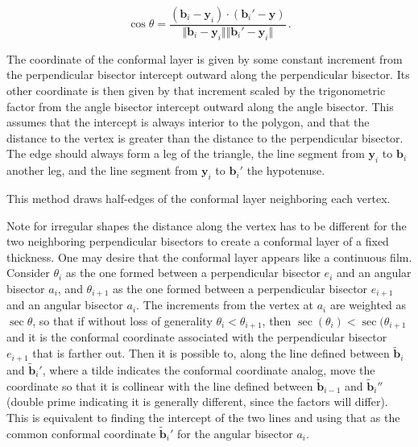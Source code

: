 \documentclass{article}
\begin{document}
$$\cos\theta = \frac{ (\mathbf{b}_i - \mathbf{y}_i) \cdot (\mathbf{b}_i' - \mathbf{y}) }{ \Vert \mathbf{b}_i - \mathbf{y}_i \Vert \Vert \mathbf{b}_i' - \mathbf{y}_i \Vert } \,.  $$

The coordinate of the conformal layer is given by some constant increment from the perpendicular bisector intercept outward along the perpendicular bisector. Its other coordinate is then given by that increment scaled by the trigonometric factor from the angle bisector intercept outward along the angle bisector. This assumes that the intercept is always interior to the polygon, and that the distance to the vertex is greater than the distance to the perpendicular bisector. The edge should always form a leg of the triangle, the line segment from $\mathbf{y}_i$ to $\mathbf{b}_i$ another leg, and the line segment from $\mathbf{y}_i$ to $\mathbf{b}_i'$ the hypotenuse.

This method draws half-edges of the conformal layer neighboring each vertex.

Note for irregular shapes the distance along the vertex has to be different for the two neighboring perpendicular bisectors to create a conformal layer of a fixed thickness. One may desire that the conformal layer appears like a continuous film. Consider $\theta_i$ as the one formed between a perpendicular bisector $e_i$ and an angular bisector $a_i$, and $\theta_{i+1}$ as the one formed between a perpendicular bisector $e_{i+1}$ and an angular bisector $a_i$. The increments from the vertex at $a_i$ are weighted as $\sec\theta$, so that if without loss of generality $\theta_i < \theta_{i+1}$, then $\sec(\theta_i) < \sec(\theta_{i+1}$ and it is the conformal coordinate associated with the perpendicular bisector $e_{i+1}$ that is farther out. Then it is possible to, along the line defined between $\tilde{\mathbf{b}}_i$ and $\tilde{\mathbf{b}}_i'$, where a tilde indicates the conformal coordinate analog, move the coordinate so that it is collinear with the line defined between $\tilde{\mathbf{b}}_{i-1}$ and $\tilde{\mathbf{b}}_i''$ (double prime indicating it is generally different, since the factors will differ). This is equivalent to finding the intercept of the two lines and using that as the common conformal coordinate $\tilde{\mathbf{b}}_i'$ for the angular bisector $a_i$. 
\end{document}
